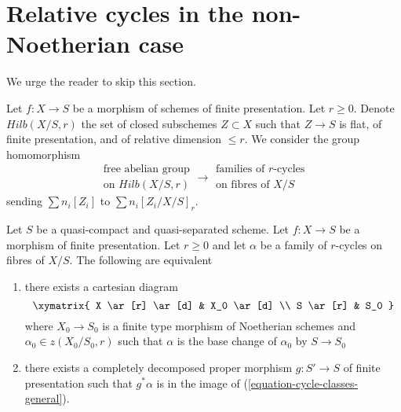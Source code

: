 \section{Relative cycles in the non-Noetherian case}
\label{section-non-noetherian}

\noindent
We urge the reader to skip this section.

\medskip\noindent
Let $f : X \to S$ be a morphism of schemes of finite presentation.
Let $r \geq 0$. Denote $Hilb(X/S, r)$ the set of closed subschemes
$Z \subset X$ such that $Z \to S$ is flat, of finite presentation,
and of relative dimension $\leq r$. We consider the group homomorphism
\begin{equation}
\label{equation-cycle-classes-general}
\begin{matrix}
\text{free abelian group} \\
\text{on }Hilb(X/S, r)
\end{matrix}
\longrightarrow
\begin{matrix}
\text{families of }r\text{-cycles}\\
\text{on fibres of }X/S
\end{matrix}
\end{equation}
sending $\sum n_i[Z_i]$ to $\sum n_i[Z_i/X/S]_r$.

\begin{lemma}
\label{lemma-relative-r-cycle-general}
Let $S$ be a quasi-compact and quasi-separated scheme.
Let $f : X \to S$ be a morphism of finite presentation.
Let $r \geq 0$ and let $\alpha$ be a family of $r$-cycles on fibres of $X/S$.
The following are equivalent
\begin{enumerate}
\item there exists a cartesian diagram
$$
\xymatrix{
X \ar[r] \ar[d] & X_0 \ar[d] \\
S \ar[r] & S_0
}
$$
where $X_0 \to S_0$ is a finite type morphism of Noetherian schemes
and $\alpha_0 \in z(X_0/S_0, r)$ such that $\alpha$ is the base change
of $\alpha_0$ by $S \to S_0$
\item there exists a completely decomposed proper morphism $g : S' \to S$
of finite presentation such that $g^*\alpha$ is in the image of
(\ref{equation-cycle-classes-general}).
\end{enumerate}
\end{lemma}

